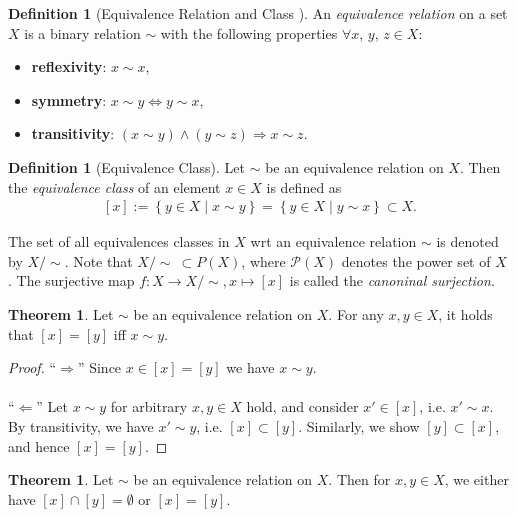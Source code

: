 \documentclass[12pt, a4paper]{article}
\numberwithin{equation}{section}
\theoremstyle{definition}
\theoremstyle{definition}
\newtheorem{defn}[thm]{Definition} %
\newtheorem{theorem}[thm]{Theorem}
\begin{document}
	\begin{defn}[Equivalence Relation and Class \cite{equivalence_relation}]\label{defn:equivalence_relation}
		An \textit{equivalence relation} on a set $X$ is a binary relation $\sim$ with the following properties $\forall x$, $y$, $z \in X$: 
		\begin{itemize}
			\item \textbf{reflexivity}: $x\sim x$, 
			\item \textbf{symmetry}: $x \sim y\Leftrightarrow y\sim x$, 
			\item  \textbf{transitivity}: $\left(x\sim y\right) \wedge \left(y\sim z\right)\Rightarrow x\sim z$.  
		\end{itemize}
	\end{defn}

	\begin{defn}[Equivalence Class]
		Let $\sim$ be an equivalence relation on $X$. Then the \textit{equivalence class} of an element $x\in X$ is defined as 
		\begin{align}
			\left[x\right] := \left\{y\in X \mid x\sim y \right\} = \left\{ y\in X \mid y\sim x \right\} \subset X. 
		\end{align}
	
		The set of all equivalences classes in $X$ wrt an equivalence relation $\sim$ is denoted by $X/\sim$. Note that $X/\sim\ \subset P(X)$, where $\mathcal P(X)$ denotes the power set of $X$ \cite{src:quotient_set_X_by_equivalence_relation}. The surjective map $f: X\rightarrow X/\sim, x\mapsto [x]$ is called the \textit{canoninal surjection}.
	\end{defn}

	\begin{theorem}\label{thrm:characterization_equivalence_classes}
		Let $\sim$ be an equivalence relation on $X$. For any $x, y\in X$, it holds that $[x] = [y]$ iff $x\sim y$.
	\end{theorem}
	
	\begin{proof}
		\enquote{$\Longrightarrow$} Since $x\in[x] = [y]$ we have $x\sim y$.
		\\ \\
		\enquote{$\Longleftarrow$} Let $x\sim y$ for arbitrary $x, y\in X$ hold, and consider $x'\in [x]$, i.e. $x'\sim x$. By transitivity, we have $x' \sim y$, i.e. $[x] \subset [y]$. Similarly, we show $[y]\subset [x]$, and hence $[x] = [y]$.
	\end{proof}

	\begin{theorem}
		Let $\sim$ be an equivalence relation on $X$. Then for $x, y\in X$, we either have $[x] \cap [y] = \emptyset$ or $[x] = [y]$.
	\end{theorem}
\end{document}
